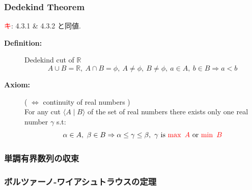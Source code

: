 \documentclass[english,dvipdfmx]{jsarticle}
\newcommand{\average}[1]{\ensuremath{\langle#1\rangle} }
\newcommand*{\point}{\textcircled{\textcolor{red}{\scriptsize キ}}}
\begin{document}
    \subsubsection{Dedekind Theorem}
    \point : 4.3.1 \& 4.3.2 と同値.
    \begin{description}
        \item[\bf{Definition:}] Dedekind cut of $\mathbb{R}$
            \begin{equation*}
                A \cup B = \mathbb{R},\ A \cap B = \phi,\ A \neq \phi,\ B \neq \phi,\ a \in A,\ b \in B \Rightarrow a < b
            \end{equation*}
        \item[\bf{Axiom:}] {\color{cyan}{Dedekind theorem}} ( $\Leftrightarrow$ continuity of real numbers ) \\
            For any cut $\average{A \mid B}$ of the set of real numbers there exists only one real number $\gamma$ s.t:
            \begin{equation*}
                \alpha \in A ,\ \beta \in B \Rightarrow \alpha \leq \gamma \leq \beta ,\ \gamma \text{ is } {\color{red}{\max \ A}} \text{ or } {\color{red}{\min \ B}}
            \end{equation*}
    \end{description}
    \subsubsection{単調有界数列の収束}
    \subsubsection{ボルツァーノ-ワイアシュトラウスの定理}

\newpage
\end{document}
